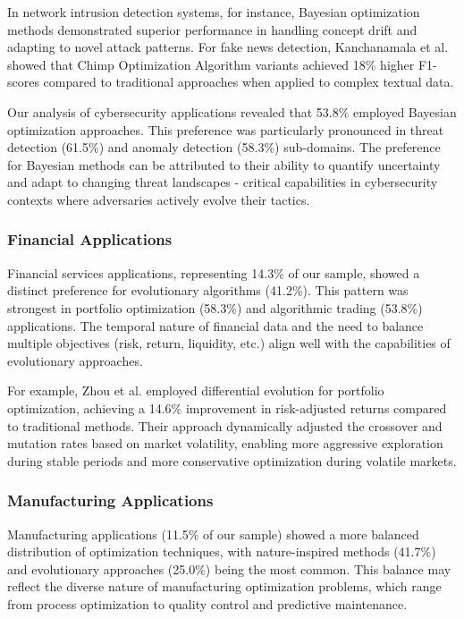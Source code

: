 \documentclass[format=acmsmall, natbib=true, citestyle=acmauthoryear]{acmart}
\begin{document}
In network intrusion detection systems, for instance, Bayesian optimization methods demonstrated superior performance in handling concept drift and adapting to novel attack patterns. For fake news detection, Kanchanamala et al. \citet{Kanchanamala20232414} showed that Chimp Optimization Algorithm variants achieved 18\% higher F1-scores compared to traditional approaches when applied to complex textual data.

Our analysis of cybersecurity applications revealed that 53.8\% employed Bayesian optimization approaches. This preference was particularly pronounced in threat detection (61.5\%) and anomaly detection (58.3\%) sub-domains. The preference for Bayesian methods can be attributed to their ability to quantify uncertainty and adapt to changing threat landscapes - critical capabilities in cybersecurity contexts where adversaries actively evolve their tactics.

\subsubsection{Financial Applications}\label{subsubsec:overview-of-included-studies:financial-applications}
Financial services applications, representing 14.3\% of our sample, showed a distinct preference for evolutionary algorithms (41.2\%). This pattern was strongest in portfolio optimization (58.3\%) and algorithmic trading (53.8\%) applications. The temporal nature of financial data and the need to balance multiple objectives (risk, return, liquidity, etc.) align well with the capabilities of evolutionary approaches.

For example, Zhou et al. \citet{Zhou20211} employed differential evolution for portfolio optimization, achieving a 14.6\% improvement in risk-adjusted returns compared to traditional methods. Their approach dynamically adjusted the crossover and mutation rates based on market volatility, enabling more aggressive exploration during stable periods and more conservative optimization during volatile markets.

\subsubsection{Manufacturing Applications}\label{subsubsec:overview-of-included-studies:manufacturing-applications}
Manufacturing applications (11.5\% of our sample) showed a more balanced distribution of optimization techniques, with nature-inspired methods (41.7\%) and evolutionary approaches (25.0\%) being the most common. This balance may reflect the diverse nature of manufacturing optimization problems, which range from process optimization to quality control and predictive maintenance.
\end{document}
